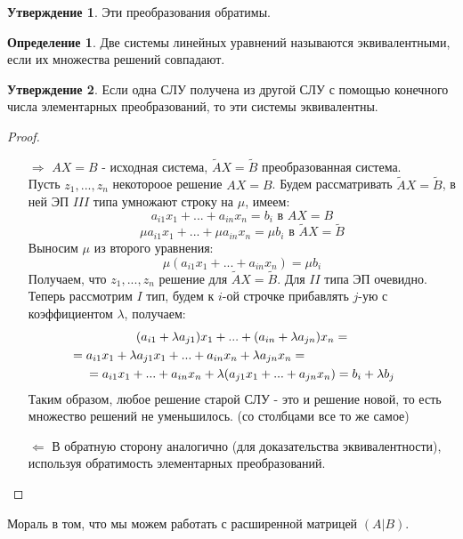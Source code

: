 \documentclass[a4paper, 12pt]{article}
\newcommand\tab[1][.5cm]{\hspace*{#1}}
\theoremstyle{definition}
\newtheorem*{definition}{Определение}
\newtheorem*{subtheorem}{Утверждение}
\begin{document}
    \begin{subtheorem}
      Эти преобразования обратимы.
    \end{subtheorem}
    \begin{definition}
      Две системы линейных уравнений называются эквивалентными, если их множества решений совпадают.
    \end{definition}
    \begin{subtheorem}
      Если одна СЛУ получена из другой СЛУ с помощью конечного числа элементарных преобразований, то эти системы эквивалентны.
    \end{subtheorem}
    \begin{proof} \tab
      \begin{itemize}
        \item[\underline{$\Longrightarrow$}]
        $AX = B$ - исходная система, $\tilde{A} X = \tilde{B}$ преобразованная система. \\
        Пусть ${z_1,...,z_n}$ некотороое решение $AX = B$. Будем рассматривать $\tilde{A} X = \tilde{B}$, в ней ЭП $III$ типа умножают строку на $\mu$, имеем:
        $$a_{i1}x_1 +...+ a_{in}x_n = b_{i} \text{ в } AX = B$$
        $$\mu a_{i1}x_1 +...+\mu a_{in}x_n = \mu b_i \text{ в } \tilde{A} X = \tilde{B}$$ 
        Выносим $\mu$ из второго уравнения:
        $$\mu (a_{i1}x_1 +...+ a_{in}x_n) = \mu b_i$$
        Получаем, что ${z_1,...,z_n}$ решение для $\tilde{A} X = \tilde{B}$. Для $II$ типа ЭП очевидно. Теперь рассмотрим $I$ тип, будем к $i$-ой строчке прибавлять $j$-ую с коэффициентом $\lambda$, получаем:
        \begin{multline*}
        (a_{i1}+\lambda a_{j1})x_1 +...+(a_{in}+\lambda a_{jn})x_n = \\ = a_{i1}x_1+\lambda a_{j1}x_1 +...+a_{in}x_n+\lambda a_{jn}x_n = \tab[3cm] \\ = a_{i1}x_1 + ... + a_{in}x_n + \lambda (a_{j1}x_1 +...+ a_{jn}x_n) = b_i + \lambda b_j
        \end{multline*}
        Таким образом, любое решение старой СЛУ - это и решение новой, то есть множество
        решений не уменьшилось. (со столбцами все то же самое)
        \item[\underline{$\Longleftarrow$}]
        В обратную сторону аналогично (для доказательства эквивалентности), используя обратимость элементарных преобразований.
      \end{itemize}
    \end{proof}
    Мораль в том, что мы можем работать с расширенной матрицей $(A|B)$.
\end{document}
